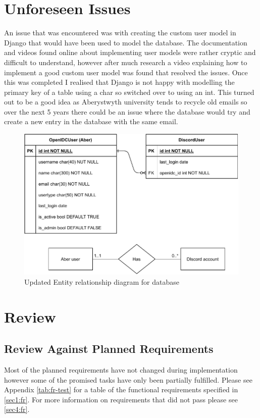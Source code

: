 \section{Unforeseen Issues}\label{sec3:unforeseen}
An issue that was encountered was with creating the custom user model in Django that would have been used to model the database. The documentation and videos found online about implementing user models were rather cryptic and difficult to understand, however after much research a video explaining how to implement a good custom user model was found that resolved the issues. Once this was completed I realised that Django is not happy with modelling the primary key of a table using a char so switched over to using an int. This turned out to be a good idea as Aberystwyth university tends to recycle old emails so over the next 5 years there could be an issue where the database would try and create a new entry in the database with the same email.
\begin{figure}[H]
	\centering
	\includegraphics[width=0.8\linewidth]{Figures/database-er-1}
	\caption{Updated Entity relationship diagram for database}
	\label{fig:database-er-1}
\end{figure}

\section{Review}
\subsection{Review Against Planned Requirements}\label{sec3:pr}
Most of the planned requirements have not changed during implementation however some of the promised tasks have only been partially fulfilled. Please see Appendix \ref{tab:fr-test} for a table of the functional requirements specified in \ref{sec1:fr}. For more information on requirements that did not pass please see \ref{sec4:fr}.

